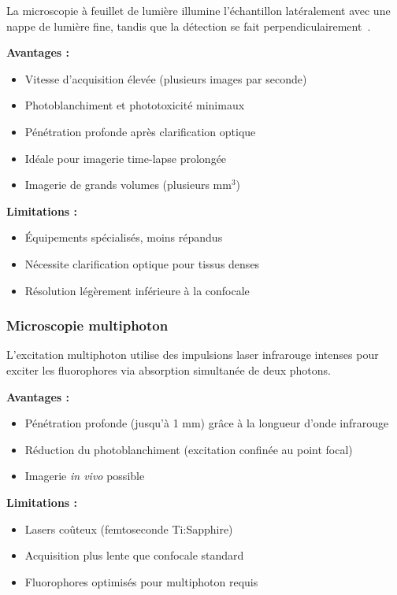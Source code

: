 La microscopie à feuillet de lumière illumine l'échantillon latéralement avec une nappe de lumière fine, tandis que la détection se fait perpendiculairement~\cite{Huisken2004}.

\textbf{Avantages :}
\begin{itemize}
    \item Vitesse d'acquisition élevée (plusieurs images par seconde)
    \item Photoblanchiment et phototoxicité minimaux
    \item Pénétration profonde après clarification optique
    \item Idéale pour imagerie time-lapse prolongée
    \item Imagerie de grands volumes (plusieurs mm$^3$)
\end{itemize}

\textbf{Limitations :}
\begin{itemize}
    \item Équipements spécialisés, moins répandus
    \item Nécessite clarification optique pour tissus denses
    \item Résolution légèrement inférieure à la confocale
\end{itemize}

\subsubsection{Microscopie multiphoton}

L'excitation multiphoton utilise des impulsions laser infrarouge intenses pour exciter les fluorophores via absorption simultanée de deux photons.

\textbf{Avantages :}
\begin{itemize}
    \item Pénétration profonde (jusqu'à 1 mm) grâce à la longueur d'onde infrarouge
    \item Réduction du photoblanchiment (excitation confinée au point focal)
    \item Imagerie \textit{in vivo} possible
\end{itemize}

\textbf{Limitations :}
\begin{itemize}
    \item Lasers coûteux (femtoseconde Ti:Sapphire)
    \item Acquisition plus lente que confocale standard
    \item Fluorophores optimisés pour multiphoton requis
\end{itemize}

